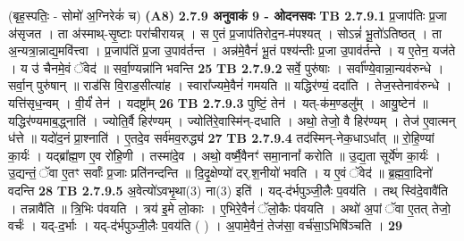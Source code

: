 \documentclass[17pt]{extarticle}
\begin{document}
{                  \newline
                                    (बृह॒स्पतिः॒ - सोमो॑ अ॒ग्निरेकं॑ च) \textbf{(A8)} \newline \newline
                \textbf{ 2.7.9     अनुवाकं   9 - ओदनसवः} \newline
                                \textbf{ TB 2.7.9.1} \newline
                  प्र॒जाप॑तिः प्र॒जा अ॑सृजत । ता अ॑स्माथ्-सृ॒ष्टाः परा॑चीरायन्न् । स ए॒तं प्र॒जाप॑तिरोद॒न-म॑पश्यत् । सोऽन्नं॑ भू॒तो॑ऽतिष्ठत् । ता अ॒न्यत्रा॒न्नाद्य॒मवि॑त्त्वा । प्र॒जाप॑तिं प्र॒जा उ॒पाव॑र्तन्त । अन्न॑मे॒वैनं॑ भू॒तं पश्य॑न्तीः प्र॒जा उ॒पाव॑र्तन्ते । य ए॒तेन॒ यज॑ते । य उ॑ चैनमे॒वं ॅवेद॑ ॥ सर्वा॒ण्यन्ना॑नि भवन्ति \textbf{ 25} \newline
                  \newline
                                \textbf{ TB 2.7.9.2} \newline
                  सर्वे॒ पुरु॑षाः । सर्वा᳚ण्ये॒वान्ना॒न्यव॑रुन्धे । सर्वा॒न् पुरु॑षान् ॥ राड॑सि वि॒राड॒सीत्या॑ह । स्वारा᳚ज्यमे॒वैनं॑ गमयति ॥ यद्धिर॑ण्यं॒ ददा॑ति । तेज॒स्तेनाव॑रुन्धे । यत्ति॑सृध॒न्वम् । वी॒र्यं॑ तेन॑ । यदष्ट्रा᳚म् \textbf{ 26} \newline
                  \newline
                                \textbf{ TB 2.7.9.3} \newline
                  पुष्टिं॒ तेन॑ । यत्-क॑म॒ण्डलु᳚म् । आयु॒ष्टेन॑ ॥ यद्धिर॑ण्यमाब॒द्ध्नाति॑ । ज्योति॒र्वै हिर॑ण्यम् । ज्योति॑रे॒वास्मि॑न्-दधाति । अथो॒ तेजो॒ वै हिर॑ण्यम् । तेज॑ ए॒वात्मन् ध॑त्ते ॥ यदो॑द॒नं प्रा॒श्नाति॑ । ए॒तदे॒व सर्व॑मव॒रुद्ध्य॑ \textbf{ 27} \newline
                  \newline
                                \textbf{ TB 2.7.9.4} \newline
                  तद॑स्मिन्-नेक॒धाऽधा᳚त् ॥ रो॒हि॒ण्यां का॒र्यः॑ । यद्ब्रा᳚ह्म॒ण ए॒व रो॑हि॒णी । तस्मा॑दे॒व । अथो॒ वर्ष्मै॒वैनꣳ॑ समा॒नानां᳚ करोति ॥ उ॒द्य॒ता सूर्ये॑ण का॒र्यः॑ । उ॒द्यन्तं॒ ॅवा ए॒तꣳ सर्वाः᳚ प्र॒जाः प्रति॑नन्दन्ति ॥ दि॒दृ॒क्षेण्यो॑ दर्.श॒नीयो॑ भवति । य ए॒वं ॅवेद॑ ॥ ब्र॒ह्म॒वा॒दिनो॑ वदन्ति \textbf{ 28} \newline
                  \newline
                                \textbf{ TB 2.7.9.5} \newline
                  अ॒वेत्यो॑ऽवभृ॒था(3) ना(3) इति॑ । यद्-द॑र्भपुञ्जी॒लैः प॒वय॑ति । तथ् स्वि॑दे॒वावै॑ति । तन्नावै॑ति ॥ त्रि॒भिः प॑वयति । त्रय॑ इ॒मे लो॒काः । ए॒भिरे॒वैनं॑ ॅलो॒कैः प॑वयति । अथो॑ अ॒पां ॅवा ए॒तत् तेजो॒ वर्चः॑ । यद्-द॒र्भाः । यद्-द॑र्भपुञ्जी॒लैः प॒वय॑ति ( ) । अ॒पामे॒वैनं॒ तेज॑सा॒ वर्च॑सा॒ऽभिषि॑ञ्चति । \textbf{ 29} \newline
}
\end{document}
